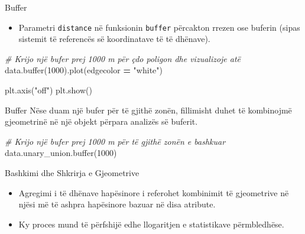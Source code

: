 \documentclass[
  ignorenonframetext,
]{beamer}
\newenvironment{Shaded}{\begin{snugshade}}{\end{snugshade}}
\newcommand{\BuiltInTok}[1]{#1}
\newcommand{\CommentTok}[1]{\textcolor[rgb]{0.56,0.35,0.01}{\textit{#1}}}
\newcommand{\DecValTok}[1]{\textcolor[rgb]{0.00,0.00,0.81}{#1}}
\newcommand{\NormalTok}[1]{#1}
\newcommand{\OperatorTok}[1]{\textcolor[rgb]{0.81,0.36,0.00}{\textbf{#1}}}
\newcommand{\StringTok}[1]{\textcolor[rgb]{0.31,0.60,0.02}{#1}}
\providecommand{\tightlist}{%
  \setlength{\itemsep}{0pt}\setlength{\parskip}{0pt}}
\begin{document}
\begin{frame}[fragile]{Buffer}
\protect\hypertarget{buffer-1}{}
\begin{itemize}
\tightlist
\item
  Parametri \texttt{distance} në funksionin \texttt{buffer} përcakton
  rrezen ose buferin (sipas sistemit të referencës së koordinatave të të
  dhënave).
\end{itemize}


\begin{Shaded}
\begin{Highlighting}[]
\CommentTok{\# Krijo një bufer prej 1000 m për çdo poligon dhe vizualizoje atë}
\NormalTok{data.}\BuiltInTok{buffer}\NormalTok{(}\DecValTok{1000}\NormalTok{).plot(edgecolor }\OperatorTok{=} \StringTok{"white"}\NormalTok{)}

\NormalTok{plt.axis(}\StringTok{"off"}\NormalTok{)}
\NormalTok{plt.show()}
\end{Highlighting}
\end{Shaded}
\end{frame}

\begin{frame}[fragile]{Buffer}
\protect\hypertarget{buffer-2}{}
Nëse duam një bufer për të gjithë zonën, fillimisht duhet të kombinojmë
gjeometrinë në një objekt përpara analizës së buferit.


\begin{Shaded}
\begin{Highlighting}[]
\CommentTok{\# Krijo një bufer prej 1000 m për të gjithë zonën e bashkuar}
\NormalTok{data.unary\_union.}\BuiltInTok{buffer}\NormalTok{(}\DecValTok{1000}\NormalTok{)}
\end{Highlighting}
\end{Shaded}
\end{frame}

\begin{frame}{Bashkimi dhe Shkrirja e Gjeometrive}
\protect\hypertarget{bashkimi-dhe-shkrirja-e-gjeometrive}{}
\begin{itemize}
\item
  Agregimi i të dhënave hapësinore i referohet kombinimit të gjeometrive
  në njësi më të ashpra hapësinore bazuar në disa atribute.
\item
  Ky proces mund të përfshijë edhe llogaritjen e statistikave
  përmbledhëse.
\end{itemize}
\end{frame}
\end{document}
